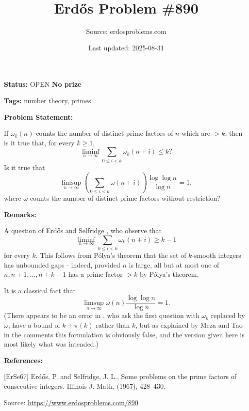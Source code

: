 \documentclass{article}
\title{Erd\H{o}s Problem \#890}
\date{Last updated: 2025-08-31}
\author{Source: erdosproblems.com}
\begin{document}
\maketitle

\noindent\textbf{Status:} OPEN \quad \textbf{No prize}

\noindent\textbf{Tags:} number theory, primes

\medskip
\noindent\textbf{Problem Statement:}

If $\omega_k(n)$ counts the number of distinct prime factors of $n$ which are $>k$, then is it true that, for every $k\geq 1$,\[\liminf_{n\to \infty}\sum_{0\leq i<k}\omega_k(n+i)\leq k?\]Is it true that\[\limsup_{n\to \infty}\left(\sum_{0\leq i<k}\omega(n+i)\right) \frac{\log\log n}{\log n}=1,\]where $\omega$ counts the number of distinct prime factors without restriction?

\bigskip
\noindent\textbf{Remarks:}

A question of Erd\H{o}s and Selfridge \cite{ErSe67}, who observe that\[\liminf_{n\to \infty}\sum_{0\leq i<k}\omega_k(n+i)\geq k-1\]for every $k$. This follows from P\'{o}lya's theorem that the set of $k$-smooth integers has unbounded gaps - indeed, provided $n$ is large, all but at most one of $n,n+1,\ldots,n+k-1$ has a prime factor $>k$ by P\'{o}lya's theorem.

It is a classical fact that\[\limsup_{n\to \infty}\omega(n)\frac{\log\log n}{\log n}=1.\](There appears to be an error in \cite{ErSe67}, who ask the first question with $\omega_k$ replaced by $\omega$, have a bound of $k+\pi(k)$ rather than $k$, but as explained by Meza and Tao in the comments this formulation is obviously false, and the version given here is most likely what was intended.)

\bigskip
\noindent\textbf{References:}

[ErSe67] Erd\H{o}s, P. and Selfridge, J. L., Some problems on the prime factors of consecutive integers. Illinois J. Math. (1967), 428--430.

\bigskip
\noindent\small{Source: \url{https://www.erdosproblems.com/890}}
\end{document}
